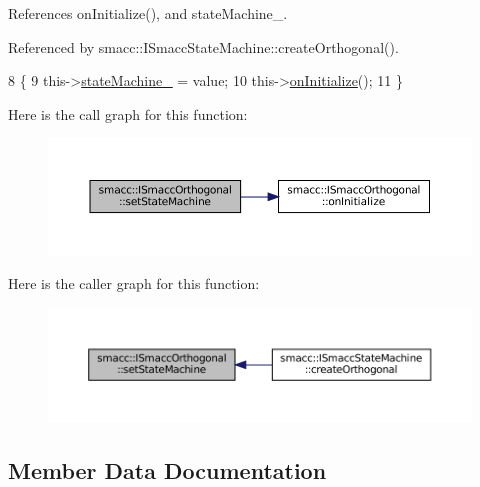 References on\+Initialize(), and state\+Machine\+\_\+.



Referenced by smacc\+::\+I\+Smacc\+State\+Machine\+::create\+Orthogonal().


\begin{DoxyCode}
8   \{
9     this->\hyperlink{classsmacc_1_1ISmaccOrthogonal_a418b2e094a65013444ec1fca7e94f28d}{stateMachine\_} = value;
10     this->\hyperlink{classsmacc_1_1ISmaccOrthogonal_a6bb31c620cb64dd7b8417f8705c79c7a}{onInitialize}();
11   \}
\end{DoxyCode}
Here is the call graph for this function\+:
\nopagebreak
\begin{figure}[H]
\begin{center}
\leavevmode
\includegraphics[width=350pt]{classsmacc_1_1ISmaccOrthogonal_a0fa0901a322f62a604c279c06d34f2f0_cgraph}
\end{center}
\end{figure}
Here is the caller graph for this function\+:
\nopagebreak
\begin{figure}[H]
\begin{center}
\leavevmode
\includegraphics[width=350pt]{classsmacc_1_1ISmaccOrthogonal_a0fa0901a322f62a604c279c06d34f2f0_icgraph}
\end{center}
\end{figure}


\subsection{Member Data Documentation}
\mbox{\label{classsmacc_1_1ISmaccOrthogonal_ad9e6c0f9055e51a61c9728ac7117dae2}} 
